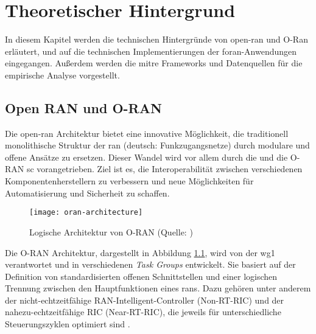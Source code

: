 \chapter{Theoretischer Hintergrund}
\label{chap:technischerHintergrund}
In diesem Kapitel werden die technischen Hintergründe von \gls{open-ran} und O-Ran erläutert, und auf die technischen Implementierungen der \gls{foran}-Anwendungen eingegangen. Außerdem werden die \gls{mitre} Frameworks und Datenquellen für die empirische Analyse vorgestellt.

\section{Open RAN und O-RAN}
\label{sec:tech-openran}
Die \gls{open-ran} Architektur bietet eine innovative Möglichkeit, die traditionell monolithische Struktur der \gls{ran} (deutsch: Funkzugangsnetze) durch modulare und offene Ansätze zu ersetzen. Dieser Wandel wird vor allem durch die \orana{} und die O-RAN \gls{sc} vorangetrieben. Ziel ist es, die Interoperabilität zwischen verschiedenen Komponentenherstellern zu verbessern und neue Möglichkeiten für Automatisierung und Sicherheit zu schaffen.

\begin{figure}
    \centering
    \texttt{[image: oran-architecture]}
    \caption{Logische Architektur von O-RAN (Quelle: \autocite{ORANAlliance})}
    \label{fig:oran-architecture}
\end{figure}

Die O-RAN Architektur, dargestellt in Abbildung \ref{fig:oran-architecture}, wird von der \gls{wg1} verantwortet und in verschiedenen \textit{Task Groups} entwickelt. Sie basiert auf der Definition von standardisierten offenen Schnittstellen und einer logischen Trennung zwischen den Hauptfunktionen eines \glspl{ran}. Dazu gehören unter anderem der nicht-echtzeitfähige RAN-Intelligent-Controller (Non-RT-RIC) und der nahezu-echtzeitfähige RIC (Near-RT-RIC), die jeweils für unterschiedliche Steuerungszyklen optimiert sind \autocite{o-ranworkgroup1usecasesandoverallarchitectureORANArchitectureDescription2024}.

